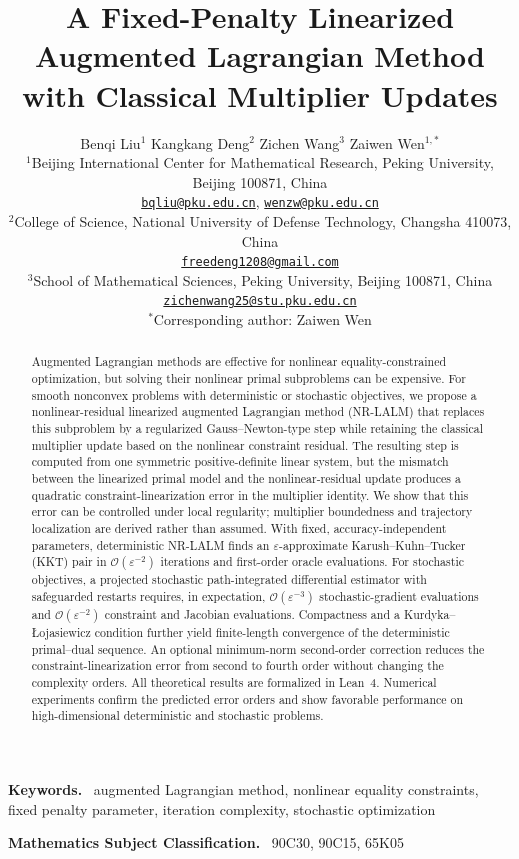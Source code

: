 \documentclass[11pt]{article}
\title{A Fixed-Penalty Linearized Augmented Lagrangian Method with Classical Multiplier Updates}
\author{%
Benqi Liu$^{1}$ \qquad Kangkang Deng$^{2}$ \qquad
Zichen Wang$^{3}$ \qquad Zaiwen Wen$^{1,*}$\\[0.7em]
\small $^{1}$Beijing International Center for Mathematical Research,
Peking University, Beijing 100871, China\\[-0.1em]
\small \href{mailto:bqliu@pku.edu.cn}{\texttt{bqliu@pku.edu.cn}},
\href{mailto:wenzw@pku.edu.cn}{\texttt{wenzw@pku.edu.cn}}\\
\small $^{2}$College of Science, National University of Defense Technology,
Changsha 410073, China\\[-0.1em]
\small \href{mailto:freedeng1208@gmail.com}{\texttt{freedeng1208@gmail.com}}\\
\small $^{3}$School of Mathematical Sciences, Peking University,
Beijing 100871, China\\[-0.1em]
\small \href{mailto:zichenwang25@stu.pku.edu.cn}{\texttt{zichenwang25@stu.pku.edu.cn}}\\
\small $^{*}$Corresponding author: Zaiwen Wen
}
\date{}
\theoremstyle{definition}
\theoremstyle{remark}
\numberwithin{equation}{section}
\numberwithin{figure}{section}
\numberwithin{table}{section}
\numberwithin{algorithm}{section}
\newenvironment{keywords}{%
  \par\medskip\noindent\textbf{Keywords.}\ }{\par}
\newenvironment{MSCcodes}{%
  \par\smallskip\noindent\textbf{Mathematics Subject Classification.}\ }{\par\medskip}
\begin{document}
\maketitle

\begin{abstract}
Augmented Lagrangian methods are effective for nonlinear equality-constrained
optimization, but solving their nonlinear primal subproblems can be expensive.
For smooth nonconvex problems with deterministic or stochastic objectives, we
propose a nonlinear-residual linearized augmented Lagrangian method (NR-LALM)
that replaces this subproblem by a regularized Gauss--Newton-type step while
retaining the classical multiplier update based on the nonlinear constraint
residual.  The resulting step is computed from one symmetric positive-definite
linear system, but the mismatch between the linearized primal model and the
nonlinear-residual update produces a quadratic constraint-linearization error
in the multiplier identity.  We show that this error can be controlled under
local regularity; multiplier boundedness and trajectory localization are
derived rather than assumed.  With fixed, accuracy-independent parameters,
deterministic NR-LALM finds an $\varepsilon$-approximate
Karush--Kuhn--Tucker (KKT) pair in $\mathcal O(\varepsilon^{-2})$ iterations
and first-order oracle evaluations.  For stochastic objectives, a projected
stochastic path-integrated differential estimator with safeguarded restarts
requires, in expectation, $\mathcal O(\varepsilon^{-3})$ stochastic-gradient
evaluations and $\mathcal O(\varepsilon^{-2})$ constraint and Jacobian
evaluations.  Compactness and a Kurdyka--{\L}ojasiewicz condition further yield
finite-length convergence of the deterministic primal--dual sequence.  An
optional minimum-norm second-order correction reduces the
constraint-linearization error from second to fourth order without changing
the complexity orders. All theoretical results are formalized in Lean~4.  Numerical experiments confirm the predicted error
orders and show favorable performance on high-dimensional deterministic and
stochastic problems.  
\end{abstract}

\begin{keywords}
augmented Lagrangian method, nonlinear equality constraints, fixed penalty parameter,
iteration complexity, stochastic optimization
\end{keywords}

\begin{MSCcodes}
90C30, 90C15, 65K05
\end{MSCcodes}
\end{document}
